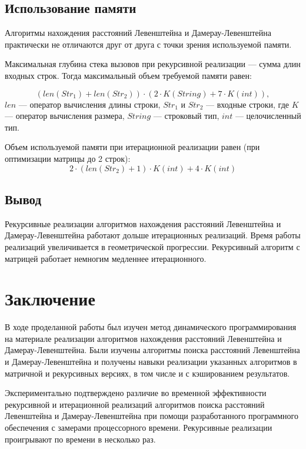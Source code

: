 \documentclass[12pt]{report}
\begin{document}
    \section{Использование памяти}
    Алгоритмы нахождения расстояний Левенштейна и Дамерау-Левенштейна практически
    не отличаются друг от друга с точки зрения используемой памяти.

    Максимальная глубина стека вызовов при рекурсивной реализации --- сумма длин входных строк.
    Тогда максимальный объем требуемой памяти равен:

    \begin{equation}
        (len(Str_{1}) + len(Str_{2})) \cdot
        (2 \cdot K(String) + 7 \cdot K(int)),
    \end{equation}
    $len$ --- оператор вычисления длины строки,
    $Str_{1}$ и $Str_{2}$ --- входные строки,
    где $K$ --- оператор вычисления размера,
    $String$ --- строковый тип, $int$ --- целочисленный тип.

    Объем используемой памяти при итерационной реализации равен (при оптимизации матрицы до 2 строк):
    \begin{equation}
        2 \cdot (len(Str_{2}) + 1) \cdot K(int) +
        4 \cdot K(int)
    \end{equation}


    \section{Вывод}
    Рекурсивные реализации алгоритмов нахождения расстояний Левенштейна и Дамерау-Левенштейна
    работают дольше итерационных реализаций.
    Время работы реализаций увеличивается в геометрической прогрессии.
    Рекурсивный алгоритм с матрицей работает немногим медленнее итерационного.

    \chapter*{Заключение}
    В ходе проделанной работы был изучен метод динамического программирования на материале реализации
    алгоритмов нахождения расстояний Левенштейна и Дамерау-Левенштейна.
    Были изучены алгоритмы поиска расстояний Левенштейна и Дамерау-Левенштейна и получены навыки
    реализации указанных алгоритмов в матричной и рекурсивных версиях, в том числе и с кэшированием результатов.

    Экспериментально подтверждено различие во временной эффективности рекурсивной и итерационной
    реализаций алгоритмов поиска расстояний Левенштейна и Дамерау-Левенштейна
    при помощи разработанного программного обеспечения с замерами процессорного времени.
    Рекурсивные реализации проигрывают по времени в несколько раз.
\end{document}
